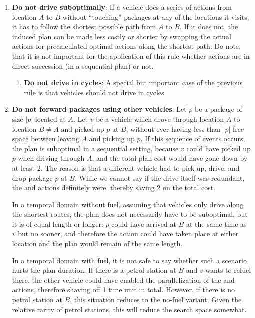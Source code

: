\begin{enumerate}
\item \textbf{Do not drive suboptimally}: If a vehicle does a series of
\drive{} actions from location $A$ to $B$ without ``touching'' packages at any of the locations it visits,
it has to follow the shortest possible path from $A$ to $B$. If it does not,
the induced plan can be made less costly or shorter by swapping the actual \drive{} actions
for precalculated optimal \drive{} actions along the shortest path.
Do note, that it is not important for the application of this rule whether actions are in direct succession (in a sequential plan) or not.
\begin{enumerate}
\item \textbf{Do not drive in cycles}: A special but important case of the previous rule is that vehicles should not drive in cycles
\end{enumerate}

\item \textbf{Do not forward packages using other vehicles}:
Let $p$ be a package of size $|p|$ located at $A$.
Let $v$ be a vehicle which drove through location $A$ to location $B \neq A$
and picked up $p$ at $B$,
without ever having less than $|p|$ free space between leaving $A$ and picking up $p$.
If this sequence of events occurs, the plan is suboptimal in a sequential setting, because
$v$ could have picked up $p$ when driving through $A$, and the total plan cost
would have gone down by at least 2. The reason is that a different vehicle had to pick up, drive, and drop package $p$ at $B$.
While we cannot say if the drive itself
was redundant, the \pickup{} and \drop{} actions definitely were, thereby saving
2 on the total cost. 

In a temporal domain without fuel, assuming that vehicles only drive along the shortest routes,
the plan does not necessarily have to be suboptimal, but it
is of equal length or longer: $p$ could have arrived at $B$ at the same time as $v$ but no sooner, and therefore the \pickup{} action could have taken place at either location and the plan would remain of the same length. 

In a temporal domain with fuel, it is not safe to say whether
such a scenario hurts the plan duration. If there is a petrol station at $B$
and $v$ wants to refuel there, the other vehicle could have enabled the parallelization 
of the  and \pickup{} actions, therefore shaving off 1 time unit in total.
However, if there is no petrol
station at $B$, this situation reduces to the no-fuel variant. Given the relative rarity of petrol stations, this will reduce the search space somewhat.
\end{enumerate}
